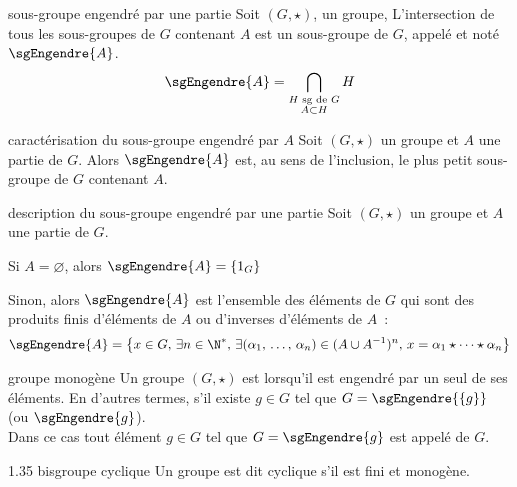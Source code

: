 

\begin{adjustwidth}{-3cm}{-3cm}


\begin{definition}{1.32}{sous-groupe engendré par une partie}
    Soit $(G,\star)$, un groupe, L’intersection de tous les sous-groupes de $G$ contenant $A$ est un sous-groupe de $G$, appelé  et noté $\sgEngendre{A}$.
    $$\sgEngendre{A} = \bigcap_{\substack{H \text{ sg de } G \\ A \subset H}} H$$
\end{definition}


\begin{proposition}{1.33}{caractérisation du sous-groupe engendré par $A$}
    Soit $(G, \star)$ un groupe et $A$ une partie de $G$. Alors $\sgEngendre{A}$ est, au sens de l’inclusion, le plus petit sous-groupe de $G$ contenant $A$.
\end{proposition}

\begin{proposition}{1.34}{description du sous-groupe engendré par une partie}
    Soit $(G,\star)$ un groupe et $A$ une partie de $G$.
    \begin{enumeratebf}
        \item Si $A = \varnothing$, alors $\sgEngendre{A} = \{1_G\}$
        \item Sinon, alors $\sgEngendre{A}$ est l’ensemble des éléments de $G$ qui sont des produits finis d’éléments de $A$ ou d’inverses
        d’éléments de $A$~:
        $$\sgEngendre{A} = \bigl\{x \in G,\, \exists n \in \N^*,\, \exists (\alpha_1,\, \dots,\, \alpha_n) \in (A \cup A^{-1})^n,\, x = \alpha_1 \star \dots \star \alpha_n \bigr\}$$
    \end{enumeratebf}
\end{proposition}


\begin{definition}{1.35}{groupe monogène}
    Un groupe $(G, \star)$ est  lorsqu’il est engendré par un seul de ses éléments. En d’autres termes, s'il existe $g \in G$ tel que $ G = \sgEngendre{\{g\}}$ (ou $\sgEngendre{g}$).\\
Dans ce cas tout élément $g \in G$ tel que $G = \sgEngendre{g}$ est appelé  de $G$.
\end{definition}

\begin{definition}{1.35 bis}{groupe cyclique}
    Un groupe est dit cyclique s'il est fini et monogène.
\end{definition}


\end{adjustwidth}
